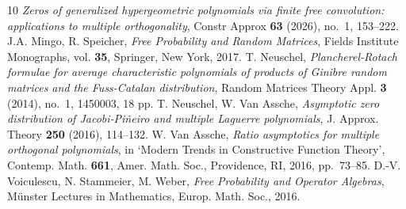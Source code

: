 \documentclass[12pt]{article}
\numberwithin{equation}{section}
\begin{document}
\begin{thebibliography}{10}
\textit{Zeros of generalized hypergeometric polynomials via finite free convolution: applications to multiple orthogonality},
Constr Approx \textbf{63} (2026), no.~1, 153--222. 
 J.A. Mingo, R. Speicher,
\textit{Free Probability and Random Matrices},
Fields Institute Monographs, vol. \textbf{35}, Springer, New York, 2017.
 T. Neuschel,
\textit{Plancherel-Rotach formulae for average characteristic polynomials of products of 
Ginibre random matrices and the Fuss-Catalan distribution},
Random Matrices Theory Appl. \textbf{3} (2014), no.~1, 1450003, 18 pp.
 T. Neuschel, W. Van Assche,
\textit{Asymptotic zero distribution of Jacobi-Pi\~neiro and multiple Laguerre polynomials},
J. Approx. Theory \textbf{250} (2016), 114--132. 
 W. Van Assche,
\textit{Ratio asymptotics for multiple orthogonal polynomials}, 
in `Modern Trends in Constructive Function Theory', Contemp. Math. \textbf{661}, Amer. Math. Soc., Providence, RI, 2016, pp.~73--85.
 D.-V. Voiculescu, N. Stammeier, M. Weber,
\textit{Free Probability and Operator Algebras},
M\"unster Lectures in Mathematics, Europ. Math. Soc., 2016.
\end{thebibliography}
\end{document}

